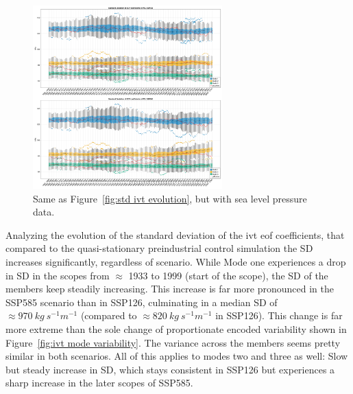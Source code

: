 \begin{figure}[htb]
  \begin{center}
    \includegraphics[width=0.65\textwidth]{figures/std_psl_50seasons_tempmodescale_3modes.png}
  \end{center}
  \caption{Same as Figure~\ref{fig:std ivt evolution}, but with sea level pressure data.}
  \label{fig:std psl evolution}
\end{figure}

Analyzing the evolution of the standard deviation of the \ac{ivt} \ac{eof} coefficients, that compared to the quasi-stationary preindustrial control simulation the SD increases significantly, regardless of scenario. 
While Mode one experiences a drop in SD in the scopes from $\approx$ 1933 to 1999 (start of the scope), the SD of the members keep steadily increasing. 
This increase is far more pronounced in the SSP585 scenario than in SSP126, culminating in a median SD of $\approx 970~kg~s^{-1} m^{-1}$ (compared to $\approx 820~kg~s^{-1}m^{-1}$ in SSP126). 
This change is far more extreme than the sole change of proportionate encoded variability shown in Figure~\ref{fig:ivt mode variability}. 
The variance across the members seems pretty similar in both scenarios. 
All of this applies to modes two and three as well: Slow but steady increase in SD, which stays consistent in SSP126 but experiences a sharp increase in the later scopes of SSP585.  



